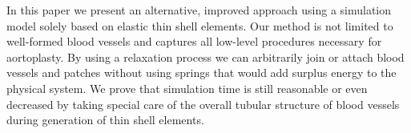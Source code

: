 In this paper we present an alternative, improved approach using a simulation model solely based on elastic thin shell elements. Our method is not limited to well-formed blood vessels and captures all low-level procedures necessary for aortoplasty. By using a relaxation process we can arbitrarily join or attach blood vessels and patches without using springs that would add surplus energy to the physical system. We prove that simulation time is still reasonable or even decreased by taking special care of the overall tubular structure of blood vessels during generation of thin shell elements.
%
%
%
%
% 
%
